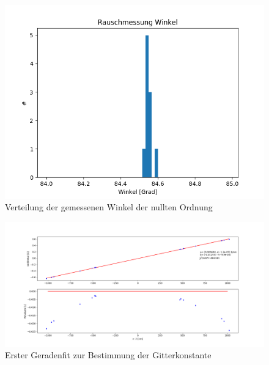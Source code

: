 \documentclass[12pt,a4paper]{article}
\begin{document}
	\begin{figure}
		\begin{center}
			\includegraphics[scale=0.7]{Bilder/Rauschmessung_Winkelmessung_Nullte_Ordnung.png}
		\end{center}
		\caption[Rauschmessung Winkelmessung]{Verteilung der gemessenen Winkel der nullten Ordnung}
		\label{fig:Rauschmessung_Winkel_Gitter}
	\end{figure}
	
	\begin{figure}
		\begin{center}
			\includegraphics[scale=0.4]{Bilder/First_Fit_Gitterkonstante.png}
		\end{center}
		\caption[Erster Fit Gitterkonstante]{Erster Geradenfit zur Bestimmung der Gitterkonstante}
		\label{fig:FirstFit_Gitterkonstante}
	\end{figure}
	
\end{document}
